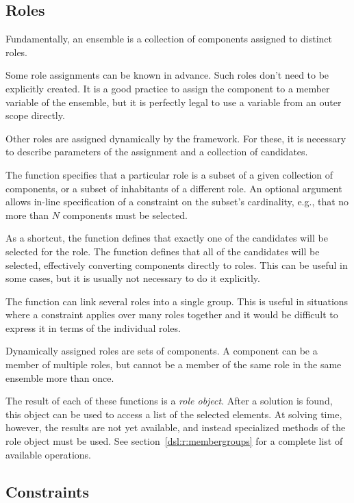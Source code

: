 \subsection{Roles}
\label{dsl:c:roles}

Fundamentally, an ensemble is a collection of components assigned to distinct roles.

Some role assignments can be known in advance. Such roles don't need to be explicitly
created. It is a good practice to assign the component to a member variable of the
ensemble, but it is perfectly legal to use a variable from an outer scope directly.

Other roles are assigned dynamically by the framework. For these, it is necessary to
describe parameters of the assignment and a collection of candidates.

The function  specifies that a particular role is a subset of a given
collection of components, or a subset of inhabitants of a different role. An optional
argument allows in-line specification of a constraint on the subset's cardinality, e.g.,
that no more than $N$ components must be selected.

As a shortcut, the  function defines that exactly one of the candidates will
be selected for the role. The  function defines that all of the candidates
will be selected, effectively converting components directly to roles. This can be
useful in some cases, but it is usually not necessary to do it explicitly.

The function  can link several roles into a single group. This is useful in
situations where a constraint applies over many roles together and it would be difficult
to express it in terms of the individual roles.

Dynamically assigned roles are sets of components. A component can be a member of
multiple roles, but cannot be a member of the same role in the same ensemble more than
once.

The result of each of these functions is a \textit{role object}. After a solution is
found, this object can be used to access a list of the selected elements. At solving
time, however, the results are not yet available, and instead specialized methods of the
role object must be used. See section~\ref{dsl:r:membergroups} for a complete list of
available operations.


\subsection{Constraints}
\label{dsl:c:constraints}

